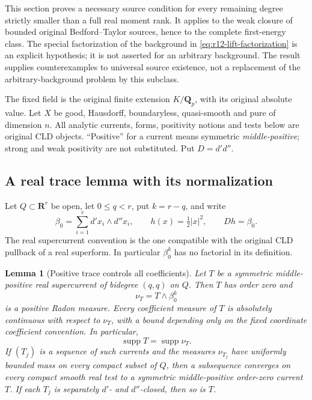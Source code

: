 \documentclass[11pt,a4paper]{article}
\numberwithin{equation}{section}
\newtheorem{lemma}[theorem]{Lemma}
\theoremstyle{definition}
\theoremstyle{remark}
\begin{document}
This section proves a necessary source condition for every remaining
degree strictly smaller than a full real moment rank.  It applies to
the weak closure of bounded original Bedford--Taylor sources, hence
to the complete first-energy class.  The special factorization of
the background in \eqref{eq:r12-lift-factorization} is an explicit
hypothesis; it is not asserted for an arbitrary background.  The
result supplies counterexamples to universal source existence, not
a replacement of the arbitrary-background problem by this subclass.

The fixed field is the original finite extension $K/\mathbf Q_p$,
with its original absolute value.  Let $X$ be good, Hausdorff,
boundaryless, quasi-smooth and pure of dimension $n$.  All analytic
currents, forms, positivity notions and tests below are original CLD
objects.  ``Positive'' for a current means symmetric
\emph{middle-positive}; strong and weak positivity are not substituted.
Put $D=d'd''$.

\subsection{A real trace lemma with its normalization}

Let $Q\subset\mathbf R^r$ be open, let $0\le q<r$, put $k=r-q$,
and write
\[
 \beta_0=\sum_{i=1}^r d'x_i\wedge d''x_i,
 \qquad h(x)=\tfrac12|x|^2,
 \qquad D h=\beta_0.
 \tag{ML1}
\]
The real supercurrent convention is the one compatible with the
original CLD pullback of a real superform.  In particular
$\beta_0^k$ has no factorial in its definition.

\begin{lemma}[Positive trace controls all coefficients]
\label{lem:r12-positive-trace-coefficients}
Let $T$ be a symmetric middle-positive real supercurrent of
bidegree $(q,q)$ on $Q$.  Then $T$ has order zero and
\[
                         \nu_T=T\wedge\beta_0^k
 \tag{ML2}
\]
is a positive Radon measure.  Every coefficient measure of $T$ is
absolutely continuous with respect to $\nu_T$, with a bound depending
only on the fixed coordinate coefficient convention.  In particular,
\[
                    \operatorname{supp}T=\operatorname{supp}\nu_T.
 \tag{ML3}
\]
If $(T_j)$ is a sequence of such currents and the measures
$\nu_{T_j}$ have uniformly bounded mass on every compact subset of
$Q$, then a subsequence converges on every compact smooth real test
to a symmetric middle-positive order-zero current $T$.  If each
$T_j$ is separately $d'$- and $d''$-closed, then so is $T$.
\end{lemma}
\end{document}
